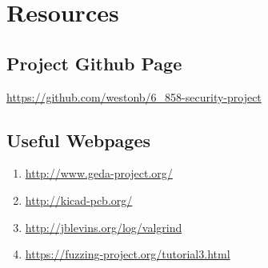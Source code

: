 \documentclass[12pt]{article}
\begin{document}
\section{Resources}
\subsection{Project Github Page}
\url{https://github.com/westonb/6_858-security-project}

\subsection{Useful Webpages}
\label{S:8}
\begin{enumerate}
	\item \url{http://www.geda-project.org/} 
	\item \url{http://kicad-pcb.org/}
	\item \url{http://jblevins.org/log/valgrind}
	\item \url{https://fuzzing-project.org/tutorial3.html}
\end{enumerate}
\end{document}
